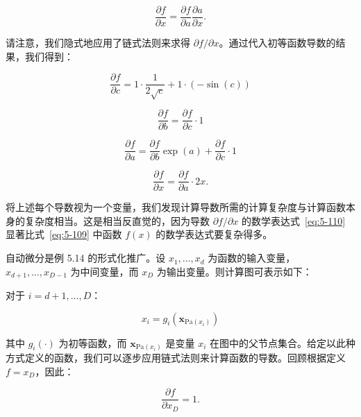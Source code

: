 \begin{notebox}
\begin{equation}
\frac{\partial f}{\partial x} = \frac{\partial f}{\partial a} \frac{\partial a}{\partial x} .
\tag{5.138}\label{eq:5-138}
\end{equation}

请注意，我们隐式地应用了链式法则来求得 $ \partial f/\partial x $。通过代入初等函数导数的结果，我们得到：

\begin{equation}
\frac{\partial f}{\partial c} = 1 \cdot \frac{1}{2\sqrt{c}} + 1 \cdot (-\sin(c))
\tag{5.139}\label{eq:5-139}
\end{equation}

\begin{equation}
\frac{\partial f}{\partial b} = \frac{\partial f}{\partial c} \cdot 1
\tag{5.140}\label{eq:5-140}
\end{equation}

\begin{equation}
\frac{\partial f}{\partial a} = \frac{\partial f}{\partial b} \exp(a) + \frac{\partial f}{\partial c} \cdot 1
\tag{5.141}\label{eq:5-141}
\end{equation}

\begin{equation}
\frac{\partial f}{\partial x} = \frac{\partial f}{\partial a} \cdot 2x .
\tag{5.142}\label{eq:5-142}
\end{equation}

将上述每个导数视为一个变量，我们发现计算导数所需的计算复杂度与计算函数本身的复杂度相当。这是相当反直觉的，因为导数 $ \partial f/\partial x $ 的数学表达式~\eqref{eq:5-110} 显著比式~\eqref{eq:5-109} 中函数 $ f(x) $ 的数学表达式要复杂得多。
\end{notebox}

自动微分是例 5.14 的形式化推广。设 $ x_1, \ldots, x_d $ 为函数的输入变量，$ x_{d+1}, \ldots, x_{D-1} $ 为中间变量，而 $ x_D $ 为输出变量。则计算图可表示如下：

对于 $ i = d + 1, \ldots, D $：

\begin{equation}
x_i = g_i(\boldsymbol{x}_{\mathrm{Pa}(x_i)})
\tag{5.143}\label{eq:5-143}
\end{equation}

其中 $ g_i(\cdot) $ 为初等函数，而 $ \boldsymbol{x}_{\mathrm{Pa}(x_i)} $ 是变量 $ x_i $ 在图中的父节点集合。给定以此种方式定义的函数，我们可以逐步应用链式法则来计算函数的导数。回顾根据定义 $ f = x_D $，因此：

\begin{equation}
\frac{\partial f}{\partial x_D} = 1 .
\tag{5.144}\label{eq:5-144}
\end{equation}

